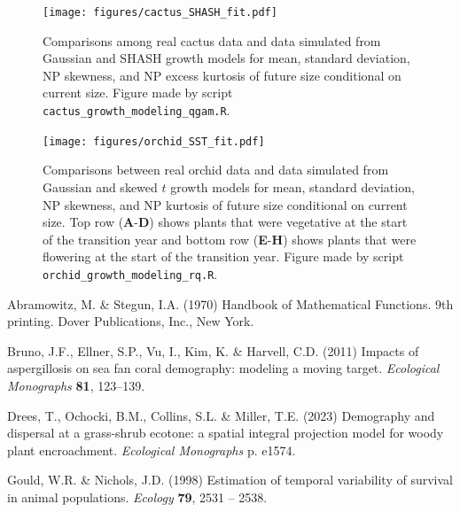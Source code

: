 \documentclass[12pt]{article}
\begin{document}
\begin{spacing}{1.35}
	\begin{figure}[h!]
		\centering
		\texttt{[image: figures/cactus\_SHASH\_fit.pdf]}
		\caption{Comparisons among real cactus data and data simulated from Gaussian and SHASH growth models for mean, standard deviation, NP skewness, and NP excess kurtosis of future size conditional on current size. Figure made by script \texttt{cactus\_growth\_modeling\_qgam.R}.}
		\label{fig:cactus_fit}
	\end{figure} 
	
	\begin{figure}[h!]
		\centering
		\texttt{[image: figures/orchid\_SST\_fit.pdf]}
		\caption{Comparisons between real orchid data and data simulated from Gaussian and skewed $t$ growth models for mean, standard deviation, NP skewness, and NP kurtosis of future size conditional on current size. Top row (\textbf{A}-\textbf{D}) shows plants that were vegetative at the start of the transition year and bottom row (\textbf{E}-\textbf{H}) shows plants that were flowering at the start of the transition year. Figure made by script \texttt{orchid\_growth\_modeling\_rq.R}.}
		\label{fig:orchid_SST_fit}
	\end{figure} 
	
	\clearpage
	\newpage 
	
	\begin{thebibliography}{62}
		\providecommand{\natexlab}[1]{#1}
		
		Abramowitz, M. \& Stegun, I.A. (1970) {Handbook of Mathematical Functions. 9th printing.}
		{D}over Publications, Inc., New York.
		
		Bruno, J.F., Ellner, S.P., Vu, I., Kim, K. \& Harvell, C.D. (2011) Impacts of
		aspergillosis on sea fan coral demography: modeling a moving target.
		\emph{Ecological Monographs} \textbf{81}, 123--139.
		
		Drees, T., Ochocki, B.M., Collins, S.L. \& Miller, T.E. (2023) Demography and
		dispersal at a grass-shrub ecotone: a spatial integral projection model for
		woody plant encroachment. \emph{Ecological Monographs} p. e1574.
		
		Gould, W.R. \& Nichols, J.D. (1998) Estimation of temporal variability of
		survival in animal populations. \emph{Ecology} \textbf{79}, 2531 -- 2538.
		

\end{thebibliography}
\end{spacing}
\end{document}
